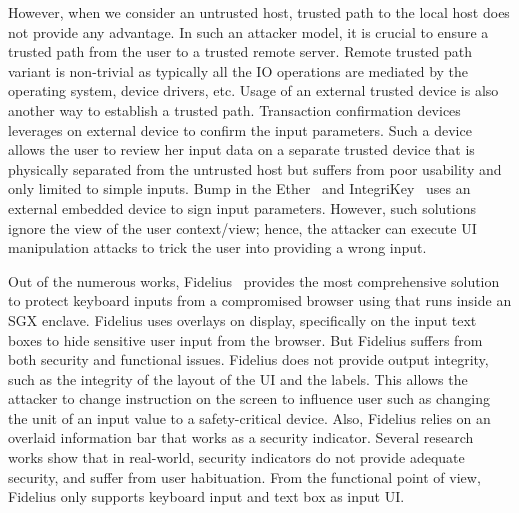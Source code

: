 However, when we consider an untrusted host, trusted path to the local host does not provide any advantage. In such an attacker model, it is crucial to ensure a trusted path from the user to a trusted remote server. Remote trusted path variant is non-trivial as typically all the IO operations are mediated by the operating system, device drivers, etc. Usage of an external trusted device is also another way to establish a trusted path. Transaction confirmation devices~\cite{filyanov2011uni,weigold2011secure} leverages on external device to confirm the input parameters. Such a device allows the user to review her input data on a separate trusted device that is physically separated from the untrusted host but suffers from poor usability and only limited to simple inputs. Bump in the Ether~\cite{McCPerRei2006} and IntegriKey~\cite{IntegriKey} uses an external embedded device to sign input parameters. However, such solutions ignore the view of the user context/view; hence, the attacker can execute UI manipulation attacks to trick the user into providing a wrong input.

Out of the numerous works, Fidelius~\cite{Fidelius} provides the most comprehensive solution to protect keyboard inputs from a compromised browser using \js that runs inside an SGX enclave. Fidelius uses overlays on display, specifically on the input text boxes to hide sensitive user input from the browser. But Fidelius suffers from both security and functional issues. Fidelius does not provide output integrity, such as the integrity of the layout of the UI and the labels. This allows the attacker to change instruction on the screen to influence user such as changing the unit of an input value to a safety-critical device. %
Also, Fidelius relies on an overlaid information bar that works as a  security indicator. Several research works show that in real-world,  security indicators do not provide adequate security, and suffer from user habituation. From the functional point of view, Fidelius only supports keyboard input and text box as input UI.
 
